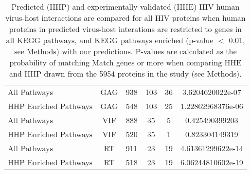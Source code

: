 \begin{table}
\begin{center}
\begin{tabular}{|l|c|c|c|c|c|}
All Pathways & GAG & 938 & 103 & 36 & 3.6204620022e-07 \\
HHP Enriched Pathways & GAG & 548 & 103 & 25 & 1.22862968376e-06 \\
All Pathways & VIF & 888 & 35 & 5 & 0.425490399203 \\
HHP Enriched Pathways & VIF & 520 & 35 & 1 & 0.823304149319 \\
All Pathways & RT & 911 & 23 & 19 & 4.61361299622e-14 \\
HHP Enriched Pathways & RT & 518 & 23 & 19 & 6.06244810602e-19 \\
\hline
  \end{tabular}
\end{center}
\caption[HIV-human interaction prediction validation with KEGG
  pathways]{\small Predicted (HHP) and experimentally validated (HHE)
  HIV-human virus-host interactions are compared for all HIV proteins
  when human proteins in predicted virus-host interations are
  restricted to genes in all KEGG pathways, and KEGG pathways enriched
  (p-value $<$ 0.01, see Methods) with our predictions. P-values are
  calculated as the probability of matching Match genes or more when
  comparing HHE and HHP drawn from the 5954 proteins in the study (see
  Methods). \label{tbl:medGenAdd4:kegg}}
\end{table}

